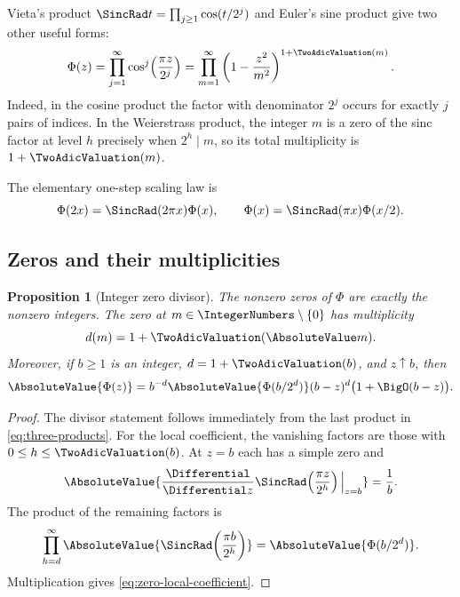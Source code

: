 \documentclass[11pt,oneside]{article}
\newtheorem{proposition}[proposition]{Proposition}
\theoremstyle{definition}
\theoremstyle{remark}
\newcommand{\Phiup}{\Phi}
\begin{document}
Vieta's product $\SincRad t=\prod_{j\ge1}\cos(t/2^j)$ and Euler's sine product give two other
useful forms:
\begin{equation}
 \Phiup(z)
 =\prod_{j=1}^{\infty}\cos^j\!\left(\frac{\pi z}{2^j}\right)
 =\prod_{m=1}^{\infty}
   \left(1-\frac{z^2}{m^2}\right)^{1+\TwoAdicValuation(m)}.
 \label{eq:three-products}
\end{equation}
Indeed, in the cosine product the factor with denominator $2^j$ occurs for exactly $j$
pairs of indices.  In the Weierstrass product, the integer $m$ is a zero of the sinc factor
at level $h$ precisely when $2^h\mid m$, so its total multiplicity is $1+\TwoAdicValuation(m)$.

The elementary one-step scaling law is
\begin{equation}
 \Phiup(2x)=\SincRad(2\pi x)\Phiup(x),
 \qquad
 \Phiup(x)=\SincRad(\pi x)\Phiup(x/2).
 \label{eq:one-step-scaling}
\end{equation}

\subsection{Zeros and their multiplicities}

\begin{proposition}[Integer zero divisor]
\label{prop:zero-divisor}
The nonzero zeros of $\Phiup$ are exactly the nonzero integers.  The zero at
$m\in\IntegerNumbers\setminus\{0\}$ has multiplicity
\[
 d(m)=1+\TwoAdicValuation(\AbsoluteValue m).
\]
Moreover, if $b\ge1$ is an integer, $d=1+\TwoAdicValuation(b)$, and $z\uparrow b$, then
\begin{equation}
 \AbsoluteValue{\Phiup(z)}
 =b^{-d}\AbsoluteValue{\Phiup(b/2^d)}(b-z)^d\bigl(1+\BigO(b-z)\bigr).
 \label{eq:zero-local-coefficient}
\end{equation}
\end{proposition}

\begin{proof}
The divisor statement follows immediately from the last product in
\eqref{eq:three-products}.  For the local coefficient, the vanishing factors are those with
$0\le h\le\TwoAdicValuation(b)$.  At $z=b$ each has a simple zero and
\[
 \AbsoluteValue{\frac{\Differential}{\Differential z}\SincRad\!\left(\frac{\pi z}{2^h}\right)\Big|_{z=b}}
 =\frac1b.
\]
The product of the remaining factors is
\[
 \prod_{h=d}^{\infty}
 \AbsoluteValue{\SincRad\!\left(\frac{\pi b}{2^h}\right)}
 =\AbsoluteValue{\Phiup(b/2^d)}.
\]
Multiplication gives \eqref{eq:zero-local-coefficient}.
\end{proof}
\end{document}
